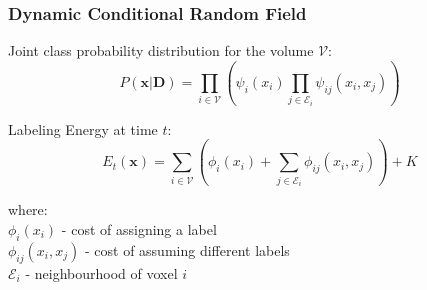 \documentclass[mathserif, 10pt]{beamer}
\begin{document}
\begin{frame}
\frametitle{Dynamic Conditional Random Field}

Joint class probability distribution for the volume $\mathcal{V}$:
  \begin{equation} \label{eq:posterior}
  P(\mathbf{x}|\mathbf{D}) = \prod_{i \in \mathcal{V}} \left( \psi_i(x_i) \prod_{j \in \mathcal{E}_i} \psi_{ij}(x_i, x_j) \right) 
  \end{equation}

\vspace{-0.5cm}
Labeling Energy at time $t$:
  \begin{equation} \label{eq:energy}
  E_t(\mathbf{x}) = \sum_{i \in \mathcal{V}} \left( \phi_i(x_i) + \sum_{j \in \mathcal{E}_i} \phi_{ij} (x_i, x_j) \right) + K
  \end{equation}
  
\vspace{-0.5cm}  
where:\\
$\phi_i(x_i)$ - cost of assigning a label \\
$\phi_{ij}(x_i, x_j)$ - cost of assuming different labels\\
$\mathcal{E}_i$ - neighbourhood of voxel $i$

\pnote{}
\end{frame}
\end{document}
